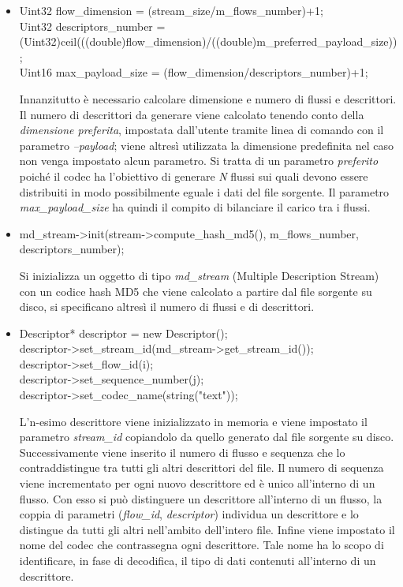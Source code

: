 \begin{itemize}
 \item \begin{code}
Uint32 flow\_dimension = (stream\_size/m\_flows\_number)+1;\\
Uint32 descriptors\_number = \\(Uint32)ceil(((double)flow\_dimension)/((double)m\_preferred\_payload\_size));\\
Uint16 max\_payload\_size = (flow\_dimension/descriptors\_number)+1;\\
\end{code}

Innanzitutto è necessario calcolare dimensione e numero di flussi e
descrittori. Il numero di descrittori da generare viene calcolato tenendo conto
della \emph{dimensione preferita}, impostata dall'utente tramite linea di
comando con il parametro \emph{--payload}; viene altresì utilizzata la dimensione predefinita nel caso non venga impostato alcun parametro. Si tratta di un parametro \emph{preferito} poiché il codec ha l'obiettivo di generare \emph{N} flussi sui quali devono essere distribuiti in modo possibilmente eguale i dati del file sorgente. Il parametro \textit{max\_payload\_size} ha quindi il compito di bilanciare il carico tra i flussi.

 \item \begin{code}
md\_stream->init(stream->compute\_hash\_md5(), m\_flows\_number, descriptors\_number);\\
\end{code}
Si inizializza un oggetto di tipo \textit{md\_stream} (Multiple Description
Stream) con un codice hash MD5 che viene calcolato a partire dal file sorgente su disco, si specificano altresì il numero di flussi e di descrittori.

 \item \begin{code}
Descriptor* descriptor = new Descriptor();\\
descriptor->set\_stream\_id(md\_stream->get\_stream\_id());\\
descriptor->set\_flow\_id(i);\\
descriptor->set\_sequence\_number(j);\\
descriptor->set\_codec\_name(string("text"));\\
\end{code}
L'n-esimo descrittore viene inizializzato in memoria e viene impostato il
parametro \textit{stream\_id} copiandolo da quello generato dal file sorgente su disco. Successivamente viene inserito il numero di flusso e sequenza che lo contraddistingue tra tutti gli altri descrittori del file. Il numero di sequenza viene incrementato per ogni nuovo descrittore ed è unico all'interno di un flusso. Con esso si può distinguere un descrittore all'interno di un flusso, la coppia di parametri (\textit{flow\_id}, \textit{descriptor}) individua un descrittore e lo distingue da tutti gli altri nell'ambito dell'intero file. Infine viene impostato il nome del codec che contrassegna ogni descrittore. Tale nome ha lo scopo di identificare, in fase di decodifica, il tipo di dati contenuti all'interno di un descrittore.


\end{itemize}
